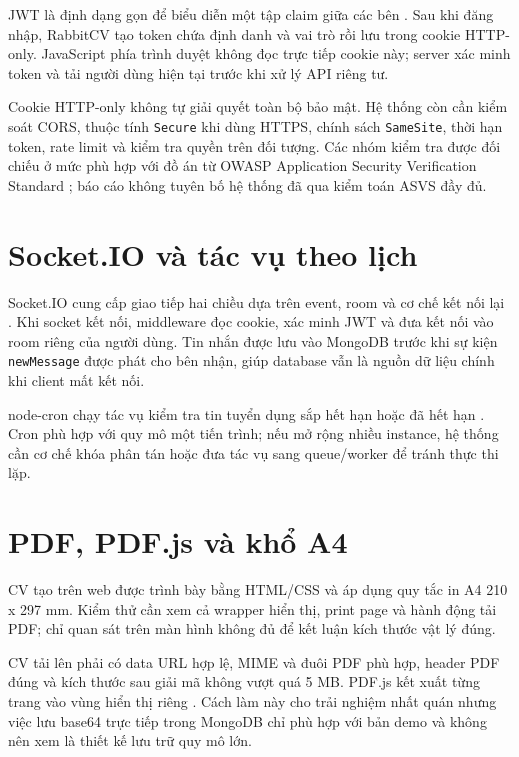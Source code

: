 JWT là định dạng gọn để biểu diễn một tập claim giữa các bên \cite{rfc7519}. Sau khi đăng nhập, RabbitCV tạo token chứa định danh và vai trò rồi lưu trong cookie HTTP-only. JavaScript phía trình duyệt không đọc trực tiếp cookie này; server xác minh token và tải người dùng hiện tại trước khi xử lý API riêng tư.

Cookie HTTP-only không tự giải quyết toàn bộ bảo mật. Hệ thống còn cần kiểm soát CORS, thuộc tính \texttt{Secure} khi dùng HTTPS, chính sách \texttt{SameSite}, thời hạn token, rate limit và kiểm tra quyền trên đối tượng. Các nhóm kiểm tra được đối chiếu ở mức phù hợp với đồ án từ OWASP Application Security Verification Standard \cite{owaspasvs}; báo cáo không tuyên bố hệ thống đã qua kiểm toán ASVS đầy đủ.

\section{Socket.IO và tác vụ theo lịch}

Socket.IO cung cấp giao tiếp hai chiều dựa trên event, room và cơ chế kết nối lại \cite{socketiodocs}. Khi socket kết nối, middleware đọc cookie, xác minh JWT và đưa kết nối vào room riêng của người dùng. Tin nhắn được lưu vào MongoDB trước khi sự kiện \texttt{newMessage} được phát cho bên nhận, giúp database vẫn là nguồn dữ liệu chính khi client mất kết nối.

node-cron chạy tác vụ kiểm tra tin tuyển dụng sắp hết hạn hoặc đã hết hạn \cite{nodecrondocs}. Cron phù hợp với quy mô một tiến trình; nếu mở rộng nhiều instance, hệ thống cần cơ chế khóa phân tán hoặc đưa tác vụ sang queue/worker để tránh thực thi lặp.

\section{PDF, PDF.js và khổ A4}

CV tạo trên web được trình bày bằng HTML/CSS và áp dụng quy tắc in A4 210 x 297 mm. Kiểm thử cần xem cả wrapper hiển thị, print page và hành động tải PDF; chỉ quan sát trên màn hình không đủ để kết luận kích thước vật lý đúng.

CV tải lên phải có data URL hợp lệ, MIME và đuôi PDF phù hợp, header PDF đúng và kích thước sau giải mã không vượt quá 5 MB. PDF.js kết xuất từng trang vào vùng hiển thị riêng \cite{pdfjsdocs}. Cách làm này cho trải nghiệm nhất quán nhưng việc lưu base64 trực tiếp trong MongoDB chỉ phù hợp với bản demo và không nên xem là thiết kế lưu trữ quy mô lớn.

